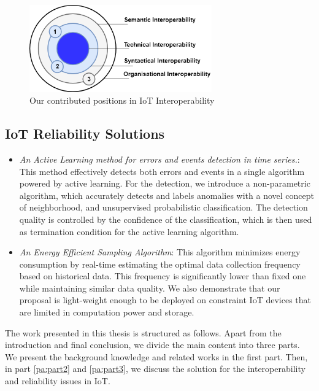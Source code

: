 \begin{figure}[h!] 
 \begin{center} 
 \includegraphics[width=0.7\textwidth]{./Introduction/Chapter1/figures/c1_IoT_contribution_interoperability.png} 
    \caption{Our contributed positions in IoT Interoperability}
     \label{fig:c1_IoT_contribution_interoperability}
  \end{center} 
\end{figure}

\subsection{IoT Reliability Solutions}
\begin{itemize}
\item \textit{An Active Learning method for errors and events detection in time series.}:  This method effectively detects both errors and events in a single algorithm powered by active learning. For the detection, we introduce a non-parametric algorithm, which accurately detects and labels anomalies with a novel concept of neighborhood, and unsupervised probabilistic classification. The detection quality is controlled by the confidence of the classification, which is then used as termination condition for the active learning algorithm. 

\item \textit{An Energy Efficient Sampling Algorithm}: This algorithm minimizes energy consumption by real-time estimating the optimal data collection frequency based on historical data. This frequency is significantly lower than fixed one while maintaining similar data quality. We also demonstrate that our proposal is light-weight enough to be deployed on constraint IoT devices that are limited in computation power and storage.   
\end{itemize}


The work presented in this thesis is structured as follows. Apart from the introduction and final conclusion, we divide the main content into three parts. We present the background knowledge and related works in the first part. Then, in part \ref{pa:part2} and \ref{pa:part3}, we discuss the solution for the interoperability and reliability issues in IoT.

